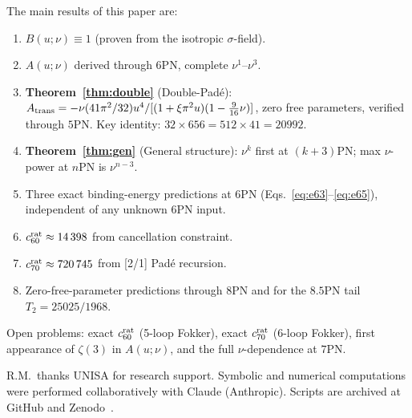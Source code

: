 \documentclass[twocolumn,aps,prd,showpacs,superscriptaddress,floatfix]{revtex4-2}
\newcommand{\pn}[1]{$#1$PN}
\begin{document}
The main results of this paper are:
\begin{enumerate}
\item $B(u;\nu)\equiv1$ (proven from the isotropic $\sigma$-field).
\item $A(u;\nu)$ derived through \pn{6}, complete $\nu^1$--$\nu^3$.
\item \textbf{Theorem~\ref{thm:double}} (Double-Pad\'e):
  $A_{\rm trans}=-\nu(41\pi^2/32)u^4/[(1+\xi\pi^2u)(1-\frac{9}{16}\nu)]$,
  zero free parameters, verified through \pn{5}.
  Key identity: $32\times656=512\times41=20992$.
\item \textbf{Theorem~\ref{thm:gen}} (General structure):
  $\nu^k$ first at $(k+3)$PN; max $\nu$-power at $n$PN is $\nu^{n-3}$.
\item Three exact binding-energy predictions at \pn{6}
  (Eqs.~\ref{eq:e63}--\ref{eq:e65}), independent of any unknown 6PN input.
\item $c_{60}^{\rm rat}\approx14\,398$ from cancellation constraint.
\item $c_{70}^{\rm rat}\approx720\,745$ from [2/1] Pad\'e recursion.
\item Zero-free-parameter predictions through \pn{8} and for the
  \pn{8.5} tail $T_2=25025/1968$.
\end{enumerate}

Open problems: exact $c_{60}^{\rm rat}$ (5-loop Fokker), exact
$c_{70}^{\rm rat}$ (6-loop Fokker), first appearance of $\zeta(3)$
in $A(u;\nu)$, and the full $\nu$-dependence at \pn{7}.

\acknowledgments
R.M.\ thanks UNISA for research support.  Symbolic and numerical
computations were performed collaboratively with Claude (Anthropic).
Scripts are archived at GitHub and Zenodo~\cite{Python:2026qgd}.
\end{document}
